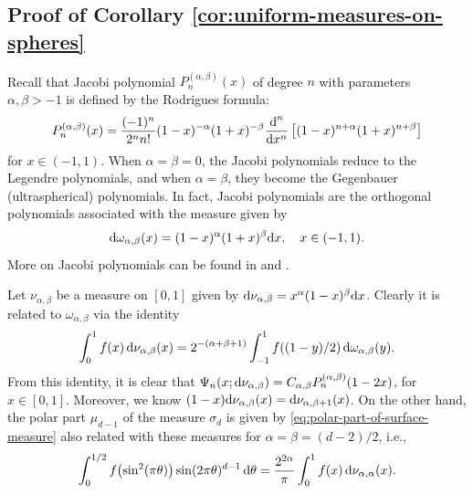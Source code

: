 \documentclass[reqno, a4paper]{amsart}
\renewcommand{\d}{\text{\rm d}}
\theoremstyle{plain}
\theoremstyle{definition}
\theoremstyle{remarkstyle}
\numberwithin{equation}{section}
\begin{document}
\subsection{Proof of Corollary \ref{cor:uniform-measures-on-spheres}}Recall that Jacobi polynomial $P_n^{(\alpha,\beta)}(x)$ of degree $n$
with parameters $\alpha, \beta > -1$ is defined by the Rodrigues formula:
\begin{equation}\label{eq:definition-of-jacobi-polynomial}
P_n^{(\alpha,\beta)}(x) = \frac{(-1)^n}{2^n n!} (1-x)^{-\alpha}(1+x)^{-\beta} \frac{\d^n}{\d x^n} \left[(1-x)^{n+\alpha}(1+x)^{n+\beta}\right]
\end{equation}
for $x \in (-1, 1)$. When $\alpha = \beta = 0$, the Jacobi polynomials reduce to the Legendre polynomials, and when $\alpha = \beta$, they become the Gegenbauer (ultraspherical) polynomials. In fact, Jacobi polynomials are the orthogonal polynomials associated with the measure given by 
\begin{equation*}
   \d\omega_{\alpha, \beta}(x)= (1-x)^\alpha (1+x)^\beta \d x, \quad x\in (-1, 1).
\end{equation*}
More on Jacobi polynomials can be found in \cite{SzegoOrthogonalPolynomials1939} and \cite{Ismail2005ClassicalAndQuantum}.

Let  $\nu_{\alpha, \beta}$ be a measure on $[0, 1]$  given by $\d\nu_{\alpha, \beta}= x^\alpha (1-x)^\beta\d x$. Clearly it is related to  $\omega_{\alpha, \beta}$ via the identity 
\begin{equation*}
    \int_{0}^1 f(x)\, \d\nu_{\alpha, \beta}(x)=2^{-(\alpha+\beta+1)}\int_{-1}^1 f((1-y)/2) \, \d\omega_{\alpha, \beta}(y). 
\end{equation*}
From this identity, it is clear that $\Psi_{n}(x; \d\nu_{\alpha, \beta})=C_{\alpha, \beta} P_n^{(\alpha, \beta)}(1-2x)$, for $x\in [0, 1]$. 
Moreover, we know $(1-x)\d\nu_{\alpha, \beta}(x)=\d\nu_{\alpha, \beta+1}(x)$. On the other hand, the polar part $\mu_{d-1}$ of the measure $\sigma_d$ is given by \eqref{eq:polar-part-of-surface-measure} also related with these measures for $\alpha=\beta=(d-2)/2$, i.e., 
\begin{equation*}
    \int_{0}^{1/2} f\bigl(\sin^2(\pi \theta)\bigr) \sin(2\pi \theta)^{d-1}\, \d \theta=\frac{2^{2\alpha}}{\pi}\int_{0}^1 f(x)\, \d\nu_{\alpha, \alpha}(x).
\end{equation*}
\end{document}
